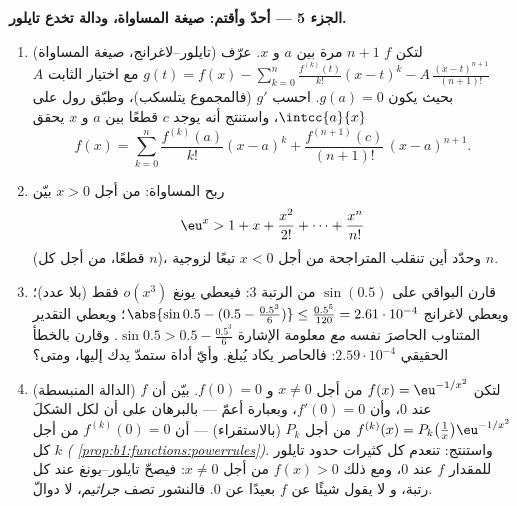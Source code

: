 \begin{problem}
\medskip
\noindent\textbf{الجزء 5 --- أحدّ وأقتم: صيغة
المساواة، ودالة تخدع تايلور.}
\begin{enumerate}[resume]
  \item (تايلور--لاغرانج، صيغة المساواة) لتكن $f$ 
        $n + 1$ مرة بين $a$ و $x$. عرّف $g(t) =
        f(x) - \sum_{k=0}^{n} \frac{f^{(k)}(t)}{k!}(x - t)^k -
        A\,\frac{(x-t)^{n+1}}{(n+1)!}$ مع اختيار الثابت $A$
        بحيث يكون $g(a) = 0$. احسب $g'$ (فالمجموع
        يتلسكب)، وطبّق رول على $\intcc{a}{x}$، واستنتج
        أنه يوجد $c$ قطعًا بين $a$ و $x$ يحقق
        \[
        f(x) = \sum_{k=0}^{n} \frac{f^{(k)}(a)}{k!}(x-a)^k
        + \frac{f^{(n+1)}(c)}{(n+1)!}\,(x-a)^{n+1} .
        \]
  \item ربح المساواة: من أجل $x > 0$ بيّن
        \[
        \eu^x > 1 + x + \frac{x^2}{2!} + \dots +
        \frac{x^n}{n!}
        \]
        (قطعًا، من أجل كل $n$)، وحدّد أين تنقلب
        المتراجحة من أجل $x < 0$ تبعًا لزوجية
        $n$.
  \item قارن البواقي على $\sin(0.5)$ من الرتبة $3$:
        فيعطي يونغ $o(x^3)$ فقط (بلا عدد)؛ ويعطي لاغرانج
        $\abs{\sin 0.5 - (0.5 - \frac{0.5^3}{6})} \leq
        \frac{0.5^5}{120} = 2.61\cdot10^{-4}$؛ ويعطي التقدير
        المتناوب الحاصرَ نفسه \emph{مع} معلومة
        الإشارة $\sin 0.5 > 0.5 - \frac{0.5^3}{6}$. وقارن
        بالخطأ الحقيقي $2.59\cdot10^{-4}$: فالحاصر يكاد
        يُبلغ. وأيّ أداة ستمدّ يدك إليها، ومتى؟
  \item (الدالة المنبسطة) لتكن $f(x) = \eu^{-1/x^2}$ من أجل $x
        \neq 0$ و $f(0) = 0$. بيّن أن $f$  عند $0$، وأن
        $f'(0) = 0$، وبعبارة أعمّ --- بالبرهان على أن
        لكل  الشكلَ $f^{(k)}(x) =
        P_k\bigl(\frac1x\bigr)\eu^{-1/x^2}$ من أجل 
        $P_k$ (بالاستقراء) --- أن $f^{(k)}(0) = 0$ من أجل كل $k$
        \emph{(
        \cref{prop:b1:functions:powerrules})}. واستنتج: تنعدم كل
        كثيرات حدود تايلور للمقدار $f$ عند $0$، ومع ذلك $f(x) > 0$
        من أجل $x \neq 0$: فيصحّ تايلور--يونغ عند كل رتبة، و
        لا يقول شيئًا عن $f$ بعيدًا عن $0$. فالنشور
        تصف \emph{جراثيم}، لا دوالّ.
\end{enumerate}


\end{problem}
